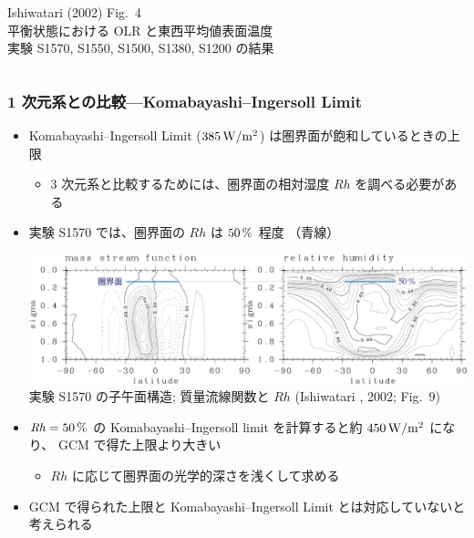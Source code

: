 \documentclass[aspectratio=149,9pt,fleqn]{beamer}
\begin{document}
\begin{frame}
\begin{columns}[T,onlytextwidth]
\begin{column}{.4\textwidth}
			\scriptsize Ishiwatari \etal (2002) Fig.\ 4\\
			平衡状態における OLR と東西平均値表面温度\\
			実験 S1570, S1550, S1500, S1380, S1200 の結果
		\end{column}
	\end{columns}
\end{frame}

\begin{frame}
	\frametitle{1 次元系との比較---Komabayashi--Ingersoll Limit}
	\begin{itemize}
		\item Komabayashi--Ingersoll Limit (\(385\hmu{W/m^2}\)) は圏界面が飽和しているときの上限
			\begin{itemize}
				\item 3 次元系と比較するためには、圏界面の相対湿度
					\(\mathit{Rh}\) を調べる必要がある
			\end{itemize}
		\item 実験 S1570 では、圏界面の \(\mathit{Rh}\) は \(50\hmu{\%}\) 程度
			\textcolor[cmyk]{1,1,0,0}{（青線）}
			\begin{center}
				\scriptsize
				\includegraphics[width=.7\textwidth]{zu-ao.pdf}\\
				実験 S1570 の子午面構造;
				質量流線関数と \(\mathit{Rh}\)  (Ishiwatari \etal*, 2002; Fig.\ 9)
			\end{center}
		\item \(\mathit{Rh}=50\hmu{\%}\) の
			Komabayashi--Ingersoll limit を計算すると約 \(450\hmu{W/m^2}\) になり、
			GCM で得た上限より大きい
			\begin{itemize}
				\item \(\mathit{Rh}\) に応じて圏界面の光学的深さを浅くして求める
			\end{itemize}
		\item GCM で得られた上限と Komabayashi--Ingersoll Limit とは対応していないと考えられる
	\end{itemize}
\end{frame}
\end{document}
